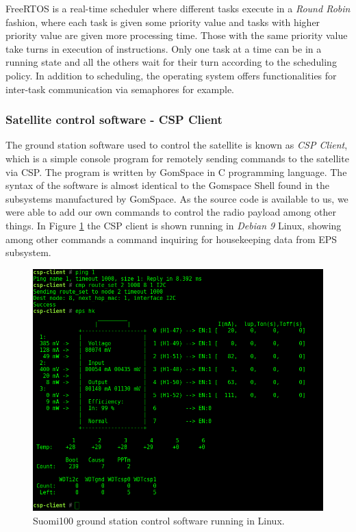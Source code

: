\documentclass[english,12pt,a4paper,pdftex,elec,utf8]{aaltothesis}
\begin{document}
FreeRTOS is a real-time scheduler where different tasks execute in a \textit{Round Robin} fashion, where each task is given some priority value and tasks with higher priority value are given more processing time. Those with the same priority value take turns in execution of instructions. Only one task at a time can be in a running state and all the others wait for their turn according to the scheduling policy. In addition to scheduling, the operating system offers functionalities for inter-task communication via semaphores for example. \cite{freertosref}\par 

\subsubsection{Satellite control software - CSP Client}
The ground station software used to control the satellite is known as \textit{CSP Client}, which is a simple console program for remotely sending commands to the satellite via CSP. The program is written by GomSpace in C programming language. The syntax of the software is almost identical to the Gomspace Shell found in the subsystems manufactured by GomSpace. As the source code is available to us, we were able to add our own commands to control the radio payload among other things. In Figure \ref{cspclient} the CSP client is shown running in \textit{Debian 9} Linux, showing among other commands a command inquiring for housekeeping data from EPS subsystem.\par 
\begin{figure}[h!]
\centering
\includegraphics[scale=0.3]{cspclient1}
\caption{Suomi100 ground station control software running in Linux.}
\label{cspclient}
\end{figure}
\end{document}
